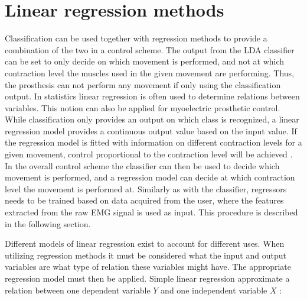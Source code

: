 \section{Linear regression methods} \label{sec:BG:linearRegressionMethods}
Classification can be used together with regression methods to provide a combination of the two in a control scheme. The output from the LDA classifier can be set to only decide on which movement is performed, and not
at which contraction level the muscles used in the given movement are performing. Thus, the prosthesis can not perform any movement if only using the classification output.  In statistics linear regression is often used to determine relations between variables. This notion can also be applied for myoelectric prosthetic control. While classification only provides an output on which class is recognized, a linear regression model provides a continuous output value based on the input value. If the regression model is fitted with information on different contraction levels for a given movement, control proportional to the contraction level will be achieved \cite{Hwang2017, Hahne2014, Bruun2017}. In the overall control scheme the classifier can then be used to decide which movement is performed, and a regression model can decide at which contraction level the movement is performed at. Similarly as with the classifier, regressors needs to be trained based on data acquired from the user, where the features extracted from the raw EMG signal is used as input. This procedure is described in the following section. 

Different models of linear regression exist to account for different uses. When utilizing regression methods it must be considered what the input and output variables are what type of relation these variables might have. The appropriate regression model must then be applied. Simple linear regression approximate a relation between one dependent variable $Y$ and one independent variable $X$ \cite{Zar2009}:

